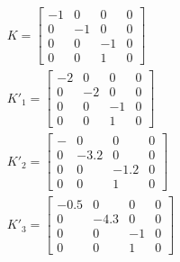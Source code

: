 \begin{gather}
K = \begin{bmatrix}
-1&0&0&0\\
0&-1&0&0\\
0&0&-1&0\\
0&0&1&0
\end{bmatrix}\\
K'_1 = \begin{bmatrix}
-2&0&0&0\\
0&-2&0&0\\
0&0&-1&0\\
0&0&1&0
\end{bmatrix}\\
K'_2 = \begin{bmatrix}
-&0&0&0\\
0&-3.2&0&0\\
0&0&-1.2&0\\
0&0&1&0
\end{bmatrix}\\
K'_3 = \begin{bmatrix}
-0.5&0&0&0\\
0&-4.3&0&0\\
0&0&-1&0\\
0&0&1&0
\end{bmatrix}\\
\end{gather}\\


